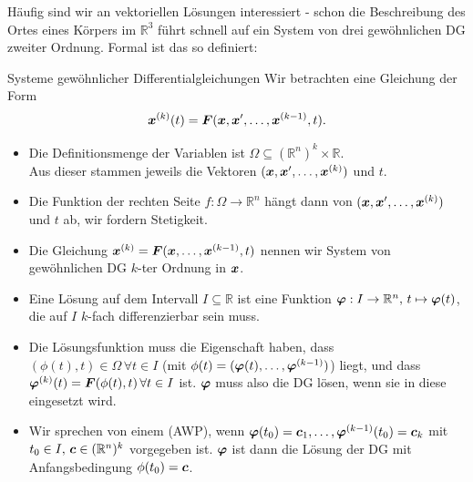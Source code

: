 Häufig sind wir an vektoriellen Lösungen interessiert - schon die Beschreibung des Ortes eines Körpers im $\mathbb{R}^3$ führt schnell auf ein System von drei gewöhnlichen DG zweiter Ordnung. Formal ist das so definiert:
\begin{Def}
{Systeme gewöhnlicher Differentialgleichungen}
Wir betrachten eine Gleichung der Form
\begin{equation*}
    {{\text{\boldmath${x}$}}}^{(k)}(t)={{\text{\boldmath${F}$}}}({{\text{\boldmath${x}$}}}, {{\text{\boldmath${x}$}}}',\ldots,{{\text{\boldmath${x}$}}}^{(k-1)},t).
\end{equation*}
\begin{itemize}
    \item Die Definitionsmenge der Variablen ist $\Omega\subseteq(\mathbb{R}^n)^k\times\mathbb{R}$.\\
    Aus dieser stammen jeweils die Vektoren $({{\text{\boldmath${x}$}}}, {{\text{\boldmath${x}$}}}',\ldots,{{\text{\boldmath${x}$}}}^{(k)})$ und $t$.
    \item Die Funktion der rechten Seite $f:\Omega\to \mathbb{R}^n$ hängt dann von $({{\text{\boldmath${x}$}}}, {{\text{\boldmath${x}$}}}',\ldots,{{\text{\boldmath${x}$}}}^{(k)})$ und $t$ ab, wir fordern Stetigkeit.
    \item Die Gleichung ${{\text{\boldmath${x}$}}}^{(k)}={{\text{\boldmath${F}$}}}({{\text{\boldmath${x}$}}},\ldots, {{\text{\boldmath${x}$}}}^{(k-1)},t)$ nennen wir System von gewöhnlichen DG $k $-ter Ordnung in ${{\text{\boldmath${x}$}}}$.
    \item Eine Lösung auf dem Intervall $I\subseteq\mathbb{R}$ ist eine Funktion ${{\text{\boldmath${\varphi}$}}}:I\to\mathbb{R}^n,\,t\mapsto{{\text{\boldmath${\varphi}$}}}(t)$, die auf $I$ $k$-fach differenzierbar sein muss.
    \item Die Lösungsfunktion muss die Eigenschaft haben, dass $(\phi(t),t)\in\Omega\,\forall t\in I$ (mit $\phi(t)=({{\text{\boldmath${\varphi}$}}}(t),\ldots,{{\text{\boldmath${\varphi}$}}}^{(k-1)})$) liegt, und dass ${{\text{\boldmath${\varphi}$}}}^{(k)}(t)={{\text{\boldmath${F}$}}}(\phi(t),t)\,\forall t\in I$ ist. ${{\text{\boldmath${\varphi}$}}}$ muss also die DG lösen, wenn sie in diese eingesetzt wird.
    \item Wir sprechen von einem  (AWP), wenn ${{\text{\boldmath${\varphi}$}}}(t_0)={{\text{\boldmath${c}$}}}_1,\ldots,{{\text{\boldmath${\varphi}$}}}^{(k-1)}(t_0)={{\text{\boldmath${c}$}}}_k$ mit $t_0\in I,\,{{\text{\boldmath${c}$}}}\in(\mathbb{R}^n)^k$ vorgegeben ist. ${{\text{\boldmath${\varphi}$}}}$ ist dann die Lösung der DG mit Anfangsbedingung $\phi(t_0)={{\text{\boldmath${c}$}}}$.
\end{itemize}
\end{Def}

